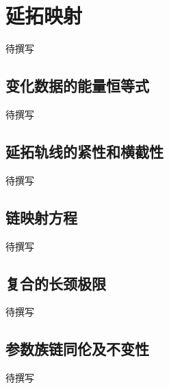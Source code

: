 
% 
% 

\section{延拓映射}
\label{g4:sec:2701}

待撰写

\subsection{变化数据的能量恒等式}
\label{g4:subsec:2701:01}
待撰写

\subsection{延拓轨线的紧性和横截性}
\label{g4:subsec:2701:02}
待撰写

\subsection{链映射方程}
\label{g4:subsec:2701:03}
待撰写

\subsection{复合的长颈极限}
\label{g4:subsec:2701:04}
待撰写

\subsection{参数族链同伦及不变性}
\label{g4:subsec:2701:05}
待撰写
